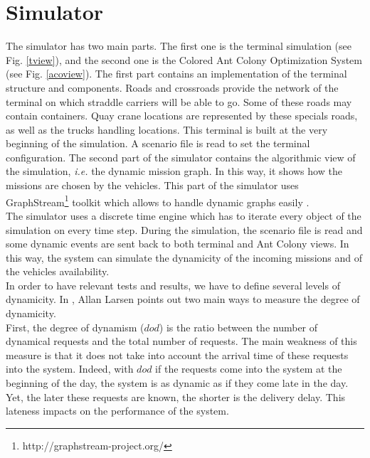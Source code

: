 \documentclass[journal]{IEEEtran}
\begin{document}
\section{Simulator}
The simulator has two main parts. The first one is the terminal simulation (see
Fig. \ref{tview}), and the second one is the Colored Ant Colony Optimization
System (see Fig. \ref{acoview}).
The first part contains an implementation of the terminal structure and
components. Roads and crossroads provide the network of the terminal on which
straddle carriers will be able to go. Some of these roads may contain
containers. Quay crane locations are represented by these specials roads, as well as
the trucks handling locations. This terminal is built at the very beginning of
the simulation. A scenario file is read to set the terminal configuration.
The second part of the simulator contains the algorithmic view of the
simulation, \textit{i.e.} the dynamic mission graph. In this way, it shows how
the missions are chosen by the vehicles. This part of the simulator uses
GraphStream\footnote{http://graphstream-project.org/} toolkit which allows to
handle dynamic graphs easily \cite{Dutot2007}.\\

The simulator uses a discrete time engine which has to iterate every object of the
simulation on every time step. During the simulation, the scenario file is
read and some dynamic events are sent back to both terminal and Ant Colony
views. In this way, the system can simulate the dynamicity %
of the incoming missions and of the vehicles availability.\\

In order to have relevant tests and results, we have to define several levels of
dynamicity. In \cite{larsen00}, Allan Larsen points out two main ways to measure the degree of dynamicity.\\

First, the degree of dynamism ($dod$) \cite{Lund96} is the ratio between
the number of dynamical requests and the total number of requests. The main weakness of this
measure is that it does not take  into account the arrival time of these
requests into the system. Indeed, with $dod$ if the requests come into the
system at the beginning of the day, the system is as dynamic as if they come
late in the day. Yet, the later these requests are known, the shorter is the
delivery delay. This lateness impacts on the performance of the system.\\
\end{document}
